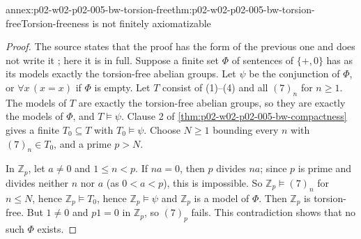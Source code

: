 \begin{annexitem}{annex:p02-w02-p02-005-bw-torsion-free}{thm:p02-w02-p02-005-bw-torsion-free}{Torsion-freeness is not finitely axiomatizable}
\begin{proof}
The source states that the proof has the form of the previous one and does
not write it \cite[ch.~A.1, \S2, p.~11]{Barwise1977FirstOrder}; here it is
in full.  Suppose a finite set \(\Phi\) of sentences of \(\{+,0\}\) has as
its models exactly the torsion-free abelian groups.  Let \(\psi\) be the
conjunction of \(\Phi\), or \(\forall x\,(x=x)\) if \(\Phi\) is empty.
Let \(T\) consist of (1)--(4) and all \((7)_n\) for \(n\geq1\).  The
models of \(T\) are exactly the torsion-free abelian groups, so they are
exactly the models of \(\Phi\), and \(T\models\psi\).  Clause 2 of
\cref{thm:p02-w02-p02-005-bw-compactness} gives a finite
\(T_0\subseteq T\) with \(T_0\models\psi\).  Choose \(N\geq1\) bounding
every \(n\) with \((7)_n\in T_0\), and a prime \(p>N\).

In \(\mathbb Z_p\), let \(a\neq0\) and \(1\leq n<p\).  If \(na=0\), then
\(p\) divides \(na\); since \(p\) is prime and divides neither \(n\) nor
\(a\) (as \(0<a<p\)), this is impossible.  So \(\mathbb Z_p\models(7)_n\)
for \(n\leq N\), hence \(\mathbb Z_p\models T_0\), hence
\(\mathbb Z_p\models\psi\) and \(\mathbb Z_p\) is a model of \(\Phi\).
Then \(\mathbb Z_p\) is torsion-free.  But \(1\neq0\) and \(p1=0\) in
\(\mathbb Z_p\), so \((7)_p\) fails.  This contradiction shows that no such
\(\Phi\) exists.
\end{proof}
\end{annexitem}

